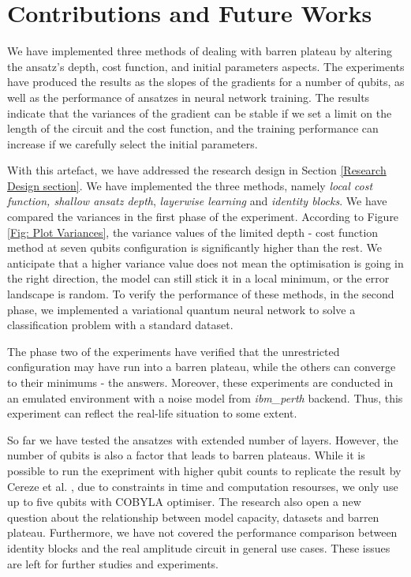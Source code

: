\section{Contributions and Future Works}

We have implemented three methods of dealing with barren plateau by altering the ansatz's depth, cost function, and initial parameters aspects.
The experiments have produced the results as the slopes of the gradients for a number of qubits, as well as the performance of ansatzes in neural network training.
The results indicate that the variances of the gradient can be stable if we set a limit on the length of the circuit and the cost function, and the training performance can increase if we carefully select the initial parameters.

With this artefact, we have addressed the research design in Section \ref{Research Design section}.
We have implemented the three methods, namely \textit{local cost function, shallow ansatz depth}, \textit{layerwise learning} and \textit{identity blocks}.
We have compared the variances in the first phase of the experiment.
According to Figure \ref{Fig: Plot Variances}, the variance values of the limited depth - cost function method at seven qubits configuration is significantly higher than the rest.
We anticipate that a higher variance value does not mean the optimisation is going in the right direction, the model can still stick it in a local minimum, or the error landscape is random.
To verify the performance of these methods, in the second phase, we implemented a variational quantum neural network to solve a classification problem with a standard dataset.

The phase two of the experiments have verified that the unrestricted configuration may have run into a barren plateau, while the others can converge to their minimums - the answers.
Moreover, these experiments are conducted in an emulated environment with a noise model from \emph{ibm\_perth} backend.
Thus, this experiment can reflect the real-life situation to some extent.


So far we have tested the ansatzes with extended number of layers.
However, the number of qubits is also a factor that leads to barren plateaus.
While it is possible to run the exepriment with higher qubit counts to replicate the result by Cereze et al. \cite{cerezoCostFunctionDependent2021}, due to constraints in time and computation resourses, we only use up to five qubits with COBYLA optimiser.
The research also open a new question about the relationship between model capacity, datasets and barren plateau.
Furthermore, we have not covered the performance comparison between identity blocks and the real amplitude circuit in general use cases.
These issues are left for further studies and experiments.


